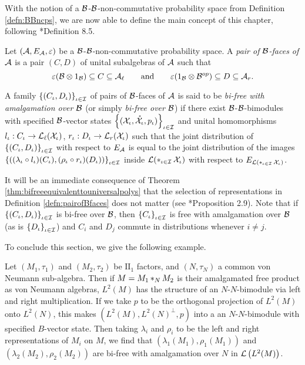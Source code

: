 With the notion of a $\mathcal{B}$-$\mathcal{B}$-non-commutative probability space from Definition \ref{defn:BBncps}, we are now able to define the main concept of this chapter, following \cite{voiculescu2014free}*{Definition 8.5}.
\begin{definition}
	\label{defn:pairofBfaces}
	Let $(\mathcal{A}, E_{\mathcal{A}}, \varepsilon)$ be a $\mathcal{B}$-$\mathcal{B}$-non-commutative probability space.
	A \emph{pair of $\mathcal{B}$-faces of $\mathcal{A}$} is a pair $(C, D)$ of unital subalgebras of $\mathcal{A}$ such that
	\[
		\varepsilon(\mathcal{B} \otimes 1_{\mathcal{B}}) \subseteq C \subseteq \mathcal{A}_\ell \qquad \mathrm{and}\qquad \varepsilon(1_{\mathcal{B}} \otimes \mathcal{B}^{op}) \subseteq D \subseteq \mathcal{A}_r.
	\]

	A family $\left\{(C_\iota, D_\iota)\right\}_{\iota \in \mathcal{I}}$ of pairs of $\mathcal{B}$-faces of $\mathcal{A}$ is said to be \emph{bi-free with amalgamation over $\mathcal{B}$} (or simply \emph{bi-free over $\mathcal{B}$}) if there exist $\mathcal{B}$-$\mathcal{B}$-bimodules with specified $\mathcal{B}$-vector states $\left\{(\mathcal{X}_\iota, \mathring{\mathcal{X}}_\iota, p_\iota)\right\}_{\iota \in \mathcal{I}}$ and unital homomorphisms $l_\iota : C_\iota \to \mathcal{L}_{\ell}(\mathcal{X}_\iota)$, $r_\iota : D_\iota \to \mathcal{L}_{r}(\mathcal{X}_\iota)$ such that the joint distribution of $\left\{(C_\iota, D_\iota)\right\}_{\iota \in \mathcal{I}}$ with respect to $E_{\mathcal{A}}$ is equal to the joint distribution of the images $\left\{((\lambda_\iota \circ l_\iota)(C_\iota), (\rho_\iota \circ r_\iota)(D_\iota))\right\}_{\iota \in \mathcal{I}}$ inside $\mathcal{L}(\mathop{\ast}_{\iota \in \mathcal{I}} \mathcal{X}_\iota)$ with respect to $E_{\mathcal{L}(\mathop{\ast}_{\iota \in \mathcal{I}} \mathcal{X}_\iota)}$.
\end{definition}

It will be an immediate consequence of Theorem \ref{thm:bifreeequivalenttouniversalpolys} that the selection of representations in Definition \ref{defn:pairofBfaces} does not matter (see \cite{voiculescu2014free}*{Proposition 2.9}).
Note that if $\left\{(C_\iota, D_\iota)\right\}_{\iota \in \mathcal{I}}$ is bi-free over $\mathcal{B}$, then $\left\{C_\iota\right\}_{\iota \in \mathcal{I}}$ is free with amalgamation over $\mathcal{B}$ (as is $\left\{D_\iota\right\}_{\iota \in \mathcal{I}}$) and $C_i$ and $D_j$ commute in distributions whenever $i \neq j$.

To conclude this section, we give the following example.
\begin{example}
	Let $(M_1, \tau_1)$ and $(M_2, \tau_2)$ be $\mathrm{II}_1$ factors, and $(N, \tau_N)$ a common von Neumann sub-algebra.
	Then if $M = M_1 \mathop{\ast}_N M_2$ is their amalgamated free product as von Neumann algebras, $L^2(M)$ has the structure of an $N$-$N$-bimodule via left and right multiplication.
	If we take $p$ to be the orthogonal projection of $L^2(M)$ onto $L^2(N)$, this makes $(L^2(M), L^2(N)^\perp, p)$ into a an $N$-$N$-bimodule with specified $B$-vector state.
	Then taking $\lambda_i$ and $\rho_i$ to be the left and right representations of $M_i$ on $M$, we find that $(\lambda_1(M_1), \rho_1(M_1))$ and $(\lambda_2(M_2), \rho_2(M_2))$ are bi-free with amalgamation over $N$ in $\mathcal{L}\left(L^2(M)\right)$.
\end{example}





